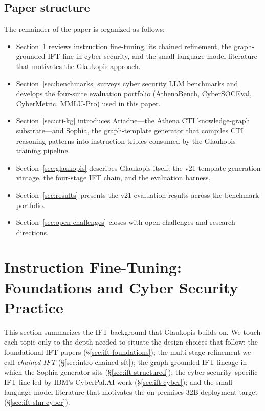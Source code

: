 \documentclass[webpdf,contemporary,large]{oup-authoring-template}
\theoremstyle{thmstyleone}
\theoremstyle{thmstyletwo}
\theoremstyle{thmstylethree}
\begin{document}
\subsection{Paper structure}
\label{sec:intro-paper-structure}
The remainder of the paper is organized as follows:
\begin{itemize}
  \item Section~\ref{sec:ift-slm} reviews instruction fine-tuning, its chained refinement, the graph-grounded IFT line in cyber security, and the small-language-model literature that motivates the Glaukopis approach.
  \item Section~\ref{sec:benchmarks} surveys cyber security LLM benchmarks and develops the four-suite evaluation portfolio (AthenaBench, CyberSOCEval, CyberMetric, MMLU-Pro) used in this paper.
  \item Section~\ref{sec:cti-kg} introduces Ariadne---the Athena CTI knowledge-graph substrate---and Sophia, the graph-template generator that compiles CTI reasoning patterns into instruction triples consumed by the Glaukopis training pipeline.
  \item Section~\ref{sec:glaukopis} describes Glaukopis itself: the v21 template-generation vintage, the four-stage IFT chain, and the evaluation harness.
  \item Section~\ref{sec:results} presents the v21 evaluation results across the benchmark portfolio.
  \item Section~\ref{sec:open-challenges} closes with open challenges and research directions.
\end{itemize}

\section{Instruction Fine-Tuning: Foundations and Cyber Security Practice}
\label{sec:ift-slm}

This section summarizes the IFT background that Glaukopis builds on. We touch each topic only to the depth needed to situate the design choices that follow: the foundational IFT papers (\S\ref{sec:ift-foundations}); the multi-stage refinement we call \emph{chained IFT} (\S\ref{sec:intro-chained-sft}); the graph-grounded IFT lineage in which the Sophia generator sits (\S\ref{sec:ift-structured}); the cyber-security--specific IFT line led by IBM's CyberPal.AI work (\S\ref{sec:ift-cyber}); and the small-language-model literature that motivates the on-premises 32B deployment target (\S\ref{sec:ift-slm-cyber}).
\end{document}
